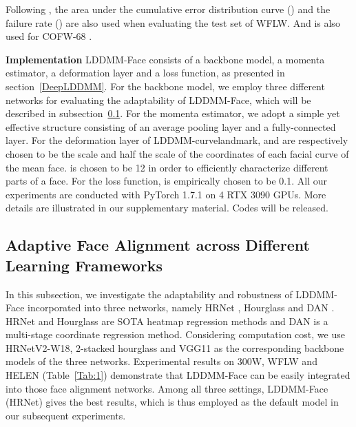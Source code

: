 \documentclass[10pt,twocolumn,letterpaper]{article}
\begin{document}
Following \cite{Wu_2018_CVPR, dong2018style}, the area under the cumulative error distribution curve () and the failure rate () are also used when evaluating the test set of WFLW. And  is also used for COFW-68 \cite{wu2017leveraging, zhu2015face}. 

\textbf{Implementation} LDDMM-Face consists of a backbone model, a momenta estimator, a deformation layer and a loss function, as presented in section~\ref{DeepLDDMM}. For the backbone model, we employ three different networks for evaluating the adaptability of LDDMM-Face, which will be described in subsection~\ref{Adaptive}. For the momenta estimator, we adopt a simple yet effective structure consisting of an average pooling layer and a fully-connected layer. For the deformation layer of LDDMM-curvelandmark,  and  are respectively chosen to be the scale and half the scale of the coordinates of each facial curve of the mean face.  is chosen to be 12 in order to efficiently characterize different parts of a face. For the loss function,  is empirically chosen to be 0.1. All our experiments are conducted with PyTorch 1.7.1 \cite{NEURIPS2019_bdbca288} on 4 RTX 3090 GPUs. More details are illustrated in our supplementary material. Codes will be released.





\subsection{Adaptive Face Alignment across Different Learning Frameworks}\label{Adaptive}
In this subsection, we investigate the adaptability and robustness of LDDMM-Face incorporated into three networks, namely HRNet \cite{wang2020deep}, Hourglass \cite{yang2017stacked} and DAN \cite{kowalski2017deep}. HRNet and Hourglass are SOTA heatmap regression methods and DAN is a multi-stage coordinate regression method. Considering computation cost, we use HRNetV2-W18, 2-stacked hourglass and VGG11 \cite{simonyan2014very} as the corresponding backbone models of the three networks. Experimental results on 300W, WFLW and HELEN (Table~\ref{Tab:1}) demonstrate that LDDMM-Face can be easily integrated into those face alignment networks. Among all three settings, LDDMM-Face (HRNet) gives the best results, which is thus employed as the default model in our subsequent experiments.
\end{document}
